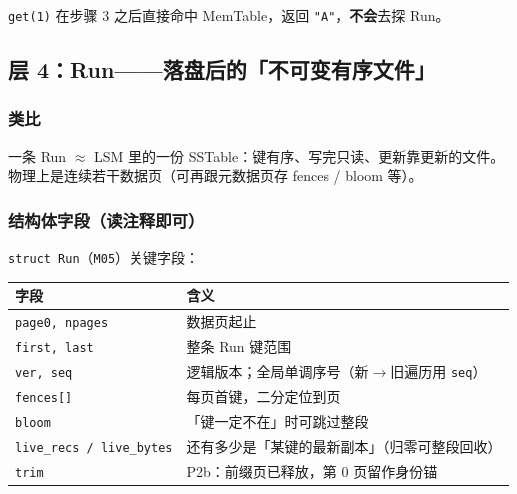 \texttt{get(1)} 在步骤 3 之后直接命中 MemTable，返回 \texttt{"A"}，\textbf{不会}去探 Run。

\subsection{层 4：Run——落盘后的「不可变有序文件」}
\label{sec:cd-run}

\subsubsection{类比}
一条 Run $\approx$ LSM 里的一份 SSTable：键有序、写完只读、更新靠更新的文件。
物理上是连续若干数据页（可再跟元数据页存 fences / bloom 等）。

\subsubsection{结构体字段（读注释即可）}
\texttt{struct Run}（\texttt{M05}）关键字段：

\begin{center}
\small
\begin{tabular}{@{}lp{9.5cm}@{}}
\toprule
字段 & 含义 \\
\midrule
\texttt{page0, npages} & 数据页起止 \\
\texttt{first, last} & 整条 Run 键范围 \\
\texttt{ver, seq} & 逻辑版本；全局单调序号（新$\to$旧遍历用 \texttt{seq}） \\
\texttt{fences[]} & 每页首键，二分定位到页 \\
\texttt{bloom} & 「键一定不在」时可跳过整段 \\
\texttt{live\_recs / live\_bytes} & 还有多少是「某键的最新副本」（归零可整段回收） \\
\texttt{trim} & P2b：前缀页已释放，第 0 页留作身份锚 \\
\bottomrule
\end{tabular}
\end{center}

